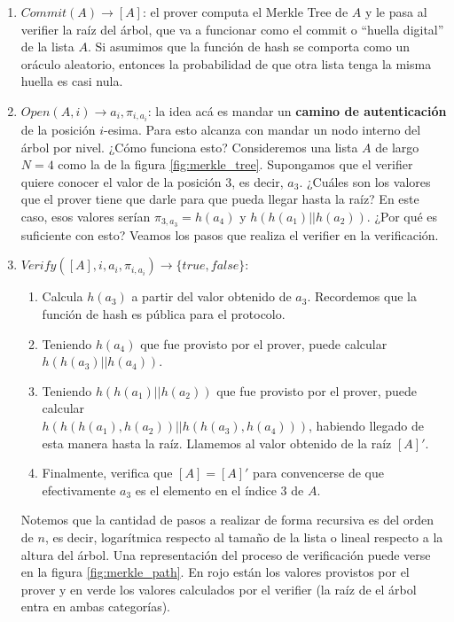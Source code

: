 \begin{enumerate}
    \item $Commit(A) \rightarrow [A]$: el prover computa el Merkle Tree de $A$ y le pasa al verifier la raíz del árbol, que va a funcionar como el commit o “huella digital'' de la lista $A$. Si asumimos que la función de hash se comporta como un oráculo aleatorio, entonces la probabilidad de que otra lista tenga la misma huella es casi nula. 
    \item $Open(A, i) \rightarrow a_i, \pi_{i,a_i}$: la idea acá es mandar un \textbf{camino de autenticación} de la posición $i$-esima. Para esto alcanza con mandar un nodo interno del árbol por nivel. ¿Cómo funciona esto? Consideremos una lista $A$ de largo $N=4$ como la de la figura \ref{fig:merkle_tree}. Supongamos que el verifier quiere conocer el valor de la posición $3$, es decir, $a_3$. ¿Cuáles son los valores que el prover tiene que darle para que pueda llegar hasta la raíz? En este caso, esos valores serían $\pi_{3,a_3} = h(a_4)$ y $h(h(a_1)||h(a_2))$. ¿Por qué es suficiente con esto? Veamos los pasos que realiza el verifier en la verificación.
    \item $Verify([A], i, a_i, \pi_{i, a_i}) \rightarrow \{true, false\}$: 
    \begin{enumerate}
        \item Calcula $h(a_3)$ a partir del valor obtenido de $a_3$. Recordemos que la función de hash es pública para el protocolo. 
        \item Teniendo $h(a_4)$ que fue provisto por el prover, puede calcular $h(h(a_3)||h(a_4))$.
        \item Teniendo $h(h(a_1)||h(a_2))$ que fue provisto por el prover, puede calcular \\ $h(h(h(a_1),h(a_2))||h(h(a_3),h(a_4)))$, habiendo llegado de esta manera hasta la raíz. Llamemos al valor obtenido de la raíz $[A]'$.
        \item Finalmente, verifica que $[A] = [A]'$ para convencerse de que efectivamente $a_3$ es el elemento en el índice $3$ de $A$.
    \end{enumerate}
    Notemos que la cantidad de pasos a realizar de forma recursiva es del orden de $n$, es decir, logarítmica respecto al tamaño de la lista o lineal respecto a la altura del árbol. Una representación del proceso de verificación puede verse en la figura \ref{fig:merkle_path}. En rojo están los valores provistos por el prover y en verde los valores calculados por el verifier (la raíz de el árbol entra en ambas categorías).
\end{enumerate}

